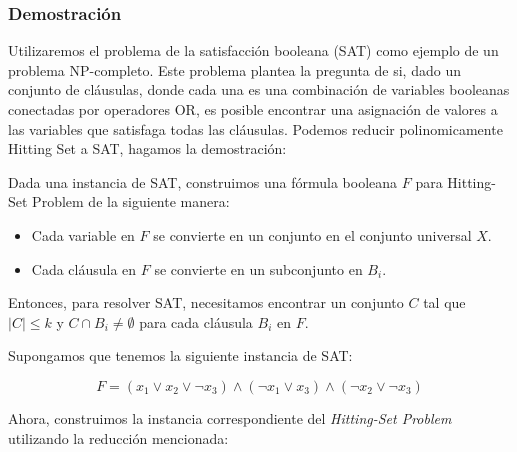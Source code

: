 \documentclass{estilo}
\begin{document}
\newpage
\subsubsection{Demostración}

Utilizaremos el problema de la satisfacción booleana (SAT) como ejemplo de un problema NP-completo. Este problema plantea la pregunta de si, dado un conjunto de cláusulas, donde cada una es una combinación de variables booleanas conectadas por operadores OR, es posible encontrar una asignación de valores a las variables que satisfaga todas las cláusulas. Podemos reducir polinomicamente Hitting Set a SAT, hagamos la demostración:

Dada una instancia de SAT, construimos una fórmula booleana \(F\) para Hitting-Set Problem de la siguiente manera:

\begin{itemize}
    \item Cada variable en \(F\) se convierte en un conjunto en el conjunto universal \(X\).
    \item Cada cláusula en \(F\) se convierte en un subconjunto en \(B_i\).
\end{itemize}

Entonces, para resolver SAT, necesitamos encontrar un conjunto \(C\) tal que \(|C| \leq k\) y \(C \cap B_i \neq \emptyset\) para cada cláusula \(B_i\) en \(F\).

Supongamos que tenemos la siguiente instancia de SAT:

\[ F = (x_1 \lor x_2 \lor \neg x_3) \land (\neg x_1 \lor x_3) \land (\neg x_2 \lor \neg x_3) \]

Ahora, construimos la instancia correspondiente del \textit{Hitting-Set Problem} utilizando la reducción mencionada:
\end{document}
